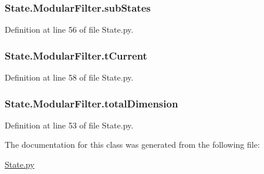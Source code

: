 \subsubsection[{\texorpdfstring{sub\+States}{subStates}}]{\setlength{\rightskip}{0pt plus 5cm}State.\+Modular\+Filter.\+sub\+States}\hypertarget{classState_1_1ModularFilter_af6128daa99126397f282ec0fcdcd3e56}{}\label{classState_1_1ModularFilter_af6128daa99126397f282ec0fcdcd3e56}


Definition at line 56 of file State.\+py.

\subsubsection[{\texorpdfstring{t\+Current}{tCurrent}}]{\setlength{\rightskip}{0pt plus 5cm}State.\+Modular\+Filter.\+t\+Current}\hypertarget{classState_1_1ModularFilter_a2b816cacd5988012193b17fcc0032d9d}{}\label{classState_1_1ModularFilter_a2b816cacd5988012193b17fcc0032d9d}


Definition at line 58 of file State.\+py.

\subsubsection[{\texorpdfstring{total\+Dimension}{totalDimension}}]{\setlength{\rightskip}{0pt plus 5cm}State.\+Modular\+Filter.\+total\+Dimension}\hypertarget{classState_1_1ModularFilter_a40c2ac71e5d1d363f0410ce94b9e8345}{}\label{classState_1_1ModularFilter_a40c2ac71e5d1d363f0410ce94b9e8345}


Definition at line 53 of file State.\+py.



The documentation for this class was generated from the following file\+:\begin{DoxyCompactItemize}
\item 
\hyperlink{State_8py}{State.\+py}\end{DoxyCompactItemize}
